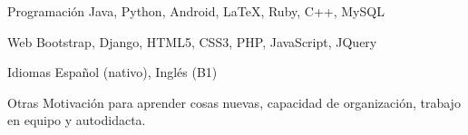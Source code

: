 

\begin{cvskills}

  \cvskill
    {Programación} %
    {Java, Python, Android, \LaTeX, Ruby, C++, MySQL} %

  \cvskill
    {Web} %
    {Bootstrap, Django, HTML5, CSS3, PHP, JavaScript, JQuery} %

  \cvskill
    {Idiomas} %
    {Español (nativo), Inglés (B1)} %

  \cvskill
    {Otras} %
    {Motivación para aprender cosas nuevas, capacidad de organización, trabajo en equipo y autodidacta.} %

\end{cvskills}
